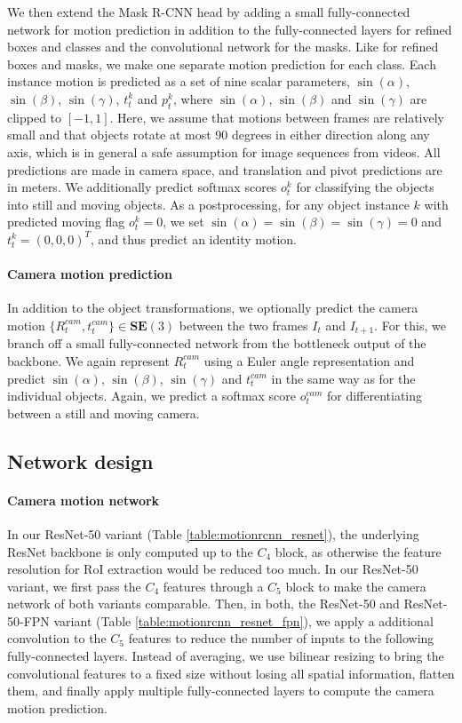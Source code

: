 We then extend the Mask R-CNN head by adding a small fully-connected network for motion
prediction in addition to the fully-connected layers for
refined boxes and classes and the convolutional network for the masks.
Like for refined boxes and masks, we make one separate motion prediction for each class.
Each instance motion is predicted as a set of nine scalar parameters,
$\sin(\alpha)$, $\sin(\beta)$, $\sin(\gamma)$, $t_t^k$ and $p_t^k$,
where $\sin(\alpha)$, $\sin(\beta)$ and $\sin(\gamma)$ are clipped to $[-1, 1]$.
Here, we assume that motions between frames are relatively small
and that objects rotate at most 90 degrees in either direction along any axis,
which is in general a safe assumption for image sequences from videos.
All predictions are made in camera space, and translation and pivot predictions are in meters.
We additionally predict softmax scores $o_t^k$ for classifying the objects into
still and moving objects. As a postprocessing, for any object instance $k$ with predicted moving flag $o_t^k = 0$,
we set $\sin(\alpha) = \sin(\beta) = \sin(\gamma) = 0$ and $t_t^k = (0,0,0)^T$,
and thus predict an identity motion.


\paragraph{Camera motion prediction}
In addition to the object transformations, we optionally predict the camera motion $\{R_t^{cam}, t_t^{cam}\}\in \mathbf{SE}(3)$
between the two frames $I_t$ and $I_{t+1}$.
For this, we branch off a small fully-connected network from the bottleneck output of the backbone.
We again represent $R_t^{cam}$ using a Euler angle representation and
predict $\sin(\alpha)$, $\sin(\beta)$, $\sin(\gamma)$ and $t_t^{cam}$ in the same way as for the individual objects.
Again, we predict a softmax score $o_t^{cam}$ for differentiating between
a still and moving camera.

\subsection{Network design}

\label{ssec:design}
\paragraph{Camera motion network}
In our ResNet-50 variant (Table \ref{table:motionrcnn_resnet}), the underlying
ResNet backbone is only computed up to the $C_4$ block, as otherwise the
feature resolution for RoI extraction would be reduced too much.
In our ResNet-50 variant, we first pass the $C_4$ features through a $C_5$
block to make the camera network of both variants comparable.
Then, in both, the ResNet-50 and ResNet-50-FPN variant (Table \ref{table:motionrcnn_resnet_fpn}), we apply a additional
convolution to the $C_5$ features to reduce the number of inputs to the following
fully-connected layers.
Instead of averaging, we use bilinear resizing to bring the convolutional features
to a fixed size without losing all spatial information,
flatten them, and finally apply multiple fully-connected layers to compute the
camera motion prediction.

